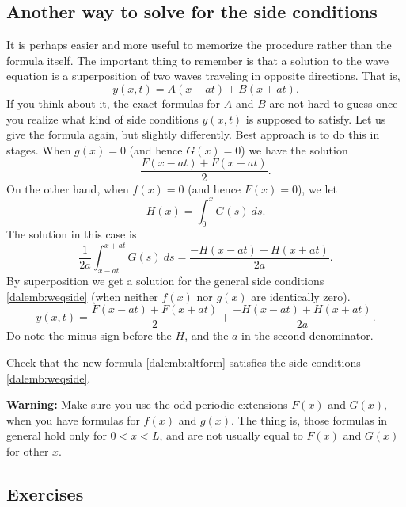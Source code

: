 \documentclass[12pt]{book}
\begin{document}
\subsection{Another way to solve for the side conditions}

It is perhaps easier and more useful
to memorize the procedure rather than the formula
itself.  The important thing to remember is that a solution to the wave
equation is a superposition of two waves traveling in opposite directions.
That is,
\begin{equation*}
y(x,t) = A(x-at) + B(x+at) .
\end{equation*}
If you think about it, the exact formulas for $A$ and $B$ are not hard
to guess once you realize what kind of side conditions $y(x,t)$ is supposed to
satisfy.  Let us give the formula again, but slightly differently.
Best approach is to do this in stages.  When $g(x) = 0$ (and hence
$G(x) = 0$) we have the solution
\begin{equation*}
\frac{ F(x-at) + F(x+at) }{2} .
\end{equation*}
On the other hand,
when $f(x) = 0$ (and hence $F(x) = 0$), we let
\begin{equation*}
H(x) = \int_0^x G(s) ~ds .
\end{equation*}
The solution in this case is
\begin{equation*}
\frac{1}{2a} \int_{x-at}^{x+at} G(s) ~ds
=
\frac{ -H(x-at) + H(x+at) }{2a} .
\end{equation*}
By superposition we get a solution for the general side conditions
\eqref{dalemb:weqside} (when neither $f(x)$ nor $g(x)$ are identically zero).
\begin{equation} \label{dalemb:altform}
y(x,t) = \frac{ F(x-at) + F(x+at) }{2} +
\frac{ -H(x-at) + H(x+at) }{2a} .
\end{equation}
Do note the minus sign before the $H$, and the $a$ in the second denominator.

\begin{exercise}
Check that the new formula \eqref{dalemb:altform} satisfies
the side conditions
\eqref{dalemb:weqside}.
\end{exercise}

\textbf{Warning:}  Make sure you use the odd periodic extensions $F(x)$ and $G(x)$,
when you have formulas for $f(x)$ and $g(x)$.
The thing is, those formulas in general hold
only for $0 < x < L$, and are not usually equal to $F(x)$ and $G(x)$
for other $x$.

\subsection{Exercises}
\end{document}
